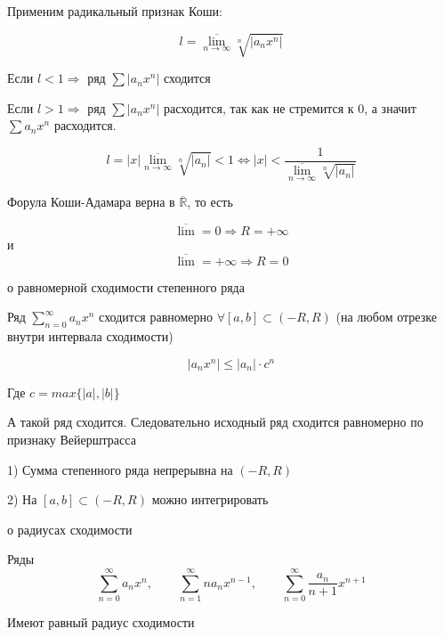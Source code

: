 \documentclass[12pt,a4paper]{article}
\begin{document}
\begin{proofbox}{}

    Применим радикальный признак Коши:

    \[
        l = \overline{\lim_{n\to\infty}}\sqrt[n]{|a_n x^n|}
    \]

    Если $l < 1 \Longrightarrow$ ряд $\sum|a_nx^n|$ сходится

    Если $l > 1 \Longrightarrow$ ряд $\sum|a_nx^n|$ расходится, так как не стремится к 0, а значит $\sum a_nx^n$ расходится.

    \[
        l = |x|\overline{\lim_{n\to\infty}}\sqrt[n]{|a_n|} < 1 \Longleftrightarrow |x| < \frac{1}{\overline{\lim_{n\to\infty}}\sqrt[n]{|a_n|}}
    \]

\end{proofbox}

\begin{note}
    Форула Коши-Адамара верна в $\overline{\mathbb{R}}$, то есть

    \[
        \overline{\lim} = 0 \Longrightarrow R = + \infty
    \]
    и
    \[
        \overline{\lim} = +\infty \Longrightarrow R = 0
    \]

\end{note}

\begin{theorem}{о равномерной сходимости степенного ряда}

    Ряд $\sum_{n=0}^\infty a_nx^n$ сходится равномерно $\forall [a, b] \subset (-R, R)$ (на любом отрезке внутри интервала сходимости)

\end{theorem}

\begin{proofbox}{}
    \[
        |a_n x^n| \leq |a_n| \cdot c^n
    \]

    Где $c = max\{|a|, |b|\}$

    А такой ряд сходится. Следовательно исходный ряд сходится равномерно по признаку Вейерштрасса

\end{proofbox}

\begin{corollary}

    1) Сумма степенного ряда непрерывна на $(-R, R)$

    2) На $[a, b] \subset (-R, R)$ можно интегрировать

\end{corollary}

\begin{lemma}{о радиусах сходимости}

    Ряды
    \[
        \sum_{n=0}^{\infty}a_nx^n,\qquad\sum_{n=1}^{\infty}na_nx^{n-1},\qquad\sum_{n=0}^{\infty}\frac{a_n}{n+1}x^{n+1}
    \]

    Имеют равный радиус сходимости

\end{lemma}
\end{document}
